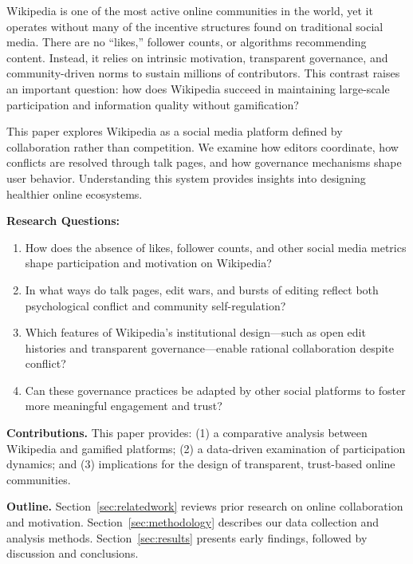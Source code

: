 
Wikipedia is one of the most active online communities in the world, yet it operates without many of the incentive structures found on traditional social media. There are no “likes,” follower counts, or algorithms recommending content. Instead, it relies on intrinsic motivation, transparent governance, and community-driven norms to sustain millions of contributors. This contrast raises an important question: how does Wikipedia succeed in maintaining large-scale participation and information quality without gamification?

This paper explores Wikipedia as a social media platform defined by collaboration rather than competition. We examine how editors coordinate, how conflicts are resolved through talk pages, and how governance mechanisms shape user behavior. Understanding this system provides insights into designing healthier online ecosystems.

\textbf{Research Questions:}
\begin{enumerate}
    \item How does the absence of likes, follower counts, and other social media metrics shape participation and motivation on Wikipedia?
    \item In what ways do talk pages, edit wars, and bursts of editing reflect both psychological conflict and community self-regulation?
    \item Which features of Wikipedia’s institutional design—such as open edit histories and transparent governance—enable rational collaboration despite conflict?
    \item Can these governance practices be adapted by other social platforms to foster more meaningful engagement and trust?
\end{enumerate}

\textbf{Contributions.} This paper provides:  
(1) a comparative analysis between Wikipedia and gamified platforms;  
(2) a data-driven examination of participation dynamics; and  
(3) implications for the design of transparent, trust-based online communities.

\textbf{Outline.} Section~\ref{sec:relatedwork} reviews prior research on online collaboration and motivation. Section~\ref{sec:methodology} describes our data collection and analysis methods. Section~\ref{sec:results} presents early findings, followed by discussion and conclusions.
